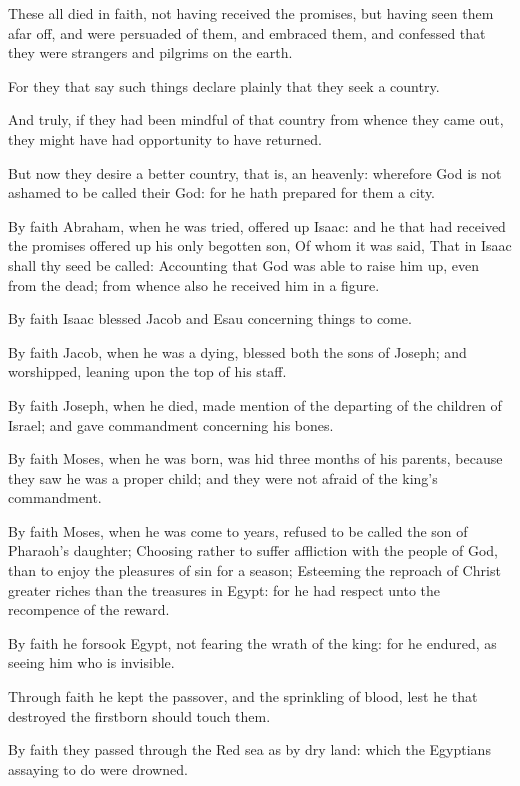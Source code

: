 \verse These all died in faith, not having received the promises, but having seen them afar off, and were persuaded of them, and embraced them, and confessed that they were strangers and pilgrims on the earth.

\verse For they that say such things declare plainly that they seek a country.

\verse And truly, if they had been mindful of that country from whence they came out, they might have had opportunity to have returned.

\verse But now they desire a better country, that is, an heavenly: wherefore God is not ashamed to be called their God: for he hath prepared for them a city.

\verse By faith Abraham, when he was tried, offered up Isaac: and he that had received the promises offered up his only begotten son, \verse Of whom it was said, That in Isaac shall thy seed be called: \verse Accounting that God was able to raise him up, even from the dead; from whence also he received him in a figure.

\verse By faith Isaac blessed Jacob and Esau concerning things to come.

\verse By faith Jacob, when he was a dying, blessed both the sons of Joseph; and worshipped, leaning upon the top of his staff.

\verse By faith Joseph, when he died, made mention of the departing of the children of Israel; and gave commandment concerning his bones.

\verse By faith Moses, when he was born, was hid three months of his parents, because they saw he was a proper child; and they were not afraid of the king's commandment.

\verse By faith Moses, when he was come to years, refused to be called the son of Pharaoh's daughter; \verse Choosing rather to suffer affliction with the people of God, than to enjoy the pleasures of sin for a season; \verse Esteeming the reproach of Christ greater riches than the treasures in Egypt: for he had respect unto the recompence of the reward.

\verse By faith he forsook Egypt, not fearing the wrath of the king: for he endured, as seeing him who is invisible.

\verse Through faith he kept the passover, and the sprinkling of blood, lest he that destroyed the firstborn should touch them.

\verse By faith they passed through the Red sea as by dry land: which the Egyptians assaying to do were drowned.

